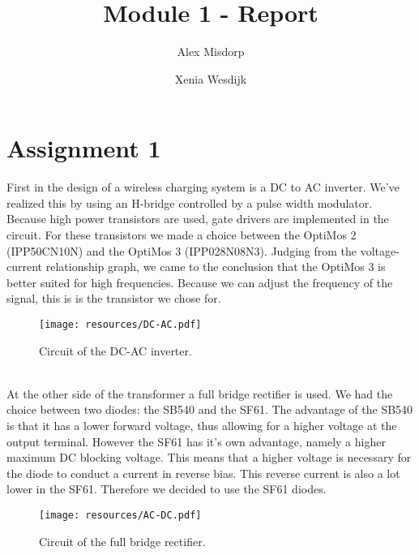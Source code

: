 \documentclass[final]{scrreprt} %
\title{Module 1 - Report}
\author{Alex {Misdorp} \and Xenia {Wesdijk}}
\begin{document}
\chapter{Assignment 1}
First in the design of a wireless charging system is a DC to AC inverter. We've realized this by using an H-bridge controlled by a pulse width modulator. Because high power transistors are used, gate drivers are implemented in the circuit. For these transistors we made a choice between the OptiMos 2 (IPP50CN10N)  and the OptiMos 3 (IPP028N08N3). Judging from the voltage-current relationship graph, we came to the conclusion that the OptiMos 3 is better suited for high frequencies. Because we can adjust the frequency of the signal, this is is the transistor we chose for.
\begin{figure}[h!]
\centering
\texttt{[image: resources/DC-AC.pdf]}
\caption{Circuit of the DC-AC inverter.}
\label{fig:DC-AC}
\end{figure}\\
At the other side of the transformer a full bridge rectifier is used. We had the choice between two diodes: the SB540 and the SF61. The advantage of the SB540 is that it has a lower forward voltage, thus allowing for a higher voltage at the output terminal. However the SF61 has it's own advantage, namely a higher maximum DC blocking voltage. This means that a higher voltage is necessary for the diode to conduct a current in reverse bias. This reverse current is also a lot lower in the SF61. Therefore we decided to use the SF61 diodes.
\begin{figure}[h!]
\centering
\texttt{[image: resources/AC-DC.pdf]}
\caption{Circuit of the full bridge rectifier.}
\label{fig:AC-DC}
\end{figure}
\end{document}
